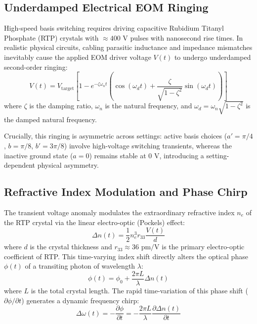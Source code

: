 \documentclass[aps,pra,reprint,superscriptaddress,amsmath,amssymb,floatfix]{revtex4-2}
\begin{document}
\subsection{Underdamped Electrical EOM Ringing}

High-speed basis switching requires driving capacitive Rubidium Titanyl Phosphate (RTP) crystals with $\approx 400\text{ V}$ pulses with nanosecond rise times. In realistic physical circuits, cabling parasitic inductance and impedance mismatches inevitably cause the applied EOM driver voltage $V(t)$ to undergo underdamped second-order ringing:
\begin{equation}
V(t) = V_{\text{target}} \left[ 1 - e^{-\zeta\omega_n t} \left( \cos(\omega_d t) + \frac{\zeta}{\sqrt{1-\zeta^2}} \sin(\omega_d t) \right) \right]
\end{equation}
where $\zeta$ is the damping ratio, $\omega_n$ is the natural frequency, and $\omega_d = \omega_n \sqrt{1-\zeta^2}$ is the damped natural frequency. 

Crucially, this ringing is asymmetric across settings: active basis choices ($a' = \pi/4$, $b = \pi/8$, $b' = 3\pi/8$) involve high-voltage switching transients, whereas the inactive ground state ($a = 0$) remains stable at $0\text{ V}$, introducing a setting-dependent physical asymmetry.

\subsection{Refractive Index Modulation and Phase Chirp}

The transient voltage anomaly modulates the extraordinary refractive index $n_e$ of the RTP crystal via the linear electro-optic (Pockels) effect:
\begin{equation}
\Delta n(t) = \frac{1}{2} n_e^3 r_{33} \frac{V(t)}{d}
\end{equation}
where $d$ is the crystal thickness and $r_{33} \approx 36\text{ pm/V}$ is the primary electro-optic coefficient of RTP. This time-varying index shift directly alters the optical phase $\phi(t)$ of a transiting photon of wavelength $\lambda$:
\begin{equation}
\phi(t) = \phi_0 + \frac{2\pi L}{\lambda} \Delta n(t)
\end{equation}
where $L$ is the total crystal length. The rapid time-variation of this phase shift ($\partial\phi/\partial t$) generates a dynamic frequency chirp:
\begin{equation}
\Delta\omega(t) = -\frac{\partial \phi}{\partial t} = -\frac{2\pi L}{\lambda} \frac{\partial \Delta n(t)}{\partial t}
\end{equation}
\end{document}
